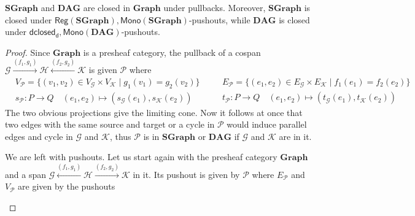\documentclass[runningheads,envcountsect]{lmcs}
\newcommand{\gr}{\catname{Graph}}
\newcommand{\dgr}{\catname{SGraph}}
\newcommand{\dg}{\catname{DAG}}
\newcommand{\rtd}{\mathsf{dclosed_{d}}}
\newcommand{\catname}[1]{\mathbf{#1}}
\newcommand{\mono}[1]{\mathsf{Mono}(\catname{#1})}
\newcommand{\reg}[1]{\mathsf{Reg}(\catname{#1})}
\theoremstyle{plain}
\theoremstyle{definition}
\begin{document}
\begin{lem}\label{lemma:gpush}$\dgr$ and $\dg$ are closed in $\gr$ under pullbacks. Moreover, $\dgr$ is closed under $\reg{\dgr}, \mono{\dgr}$-pushouts, while $\dg$ is closed under $\rtd, \mono{\dg}$-pushouts.
\end{lem}
\begin{proof} Since 
 $\gr$ is a presheaf category, the pullback of a cospan  $ \mathcal{G}\xrightarrow{(f_1,g_1)}\mathcal{H}\xleftarrow{(f_2,g_2)} \mathcal{K}$
is given $\mathcal{P}$ where
		\begin{equation*}
		\begin{split}
		&V_{\mathcal{P}}=\{(v_1, v_2)\in V_{\mathcal{G}}\times V_{\mathcal{K}}\mid g_1(v_1)=g_2(v_2)\}\\
&s_{\mathcal{P}} : P\rightarrow Q \quad (e_1, e_2) \mapsto (s_{\mathcal{G}}(e_1), s_{\mathcal{K}}(e_2))
		\end{split}
	\quad
	\begin{split}
&E_{\mathcal{P}}=\{(e_1, e_2)\in E_{\mathcal{G}}\times E_{\mathcal{K}}\mid f_1(e_1)=f_2(e_2)\} 
\\
&t_{\mathcal{P}} : P\rightarrow Q \quad (e_1, e_2) \mapsto (t_{\mathcal{G}}(e_1), t_{\mathcal{K}}(e_2))  
	\end{split}
		\end{equation*}
		The two obvious projections give the limiting cone. Now it follows at once that two edges with the same source and target or a cycle in $\mathcal{P}$ would induce parallel edges and cycle in $\mathcal{G}$ and $\mathcal{K}$, thus $\mathcal{P}$ is in $\dgr$ or $\dg$ if $\mathcal{G}$ and $\mathcal{K}$ are in it. 
		
		
		We are left with pushouts. Let us start again with the presheaf category $\gr$ and a span $ \mathcal{G}\xleftarrow{(f_1,g_1)}\mathcal{H}\xrightarrow{(f_2,g_2)}\mathcal{K}$ in it. Its pushout is given by $\mathcal{P}$ where $E_{\mathcal{P}}$ and $V_{\mathcal{P}}$ are given by
	 the pushouts
	 \begin{center}
\end{center}
\end{proof}
\end{document}
